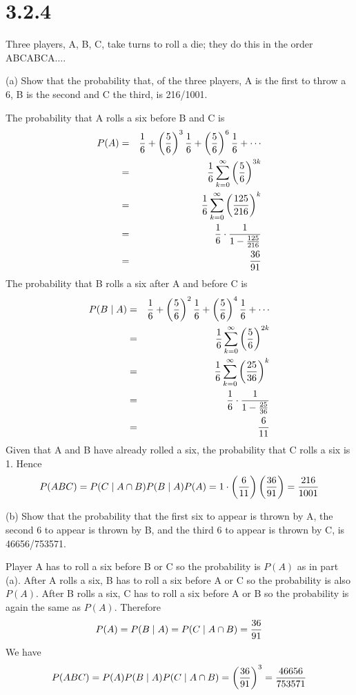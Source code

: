 \section*{3.2.4}
Three players, A, B, C, take turns to roll a die;
they do this in the order ABCABCA$\ldots$.

\bigskip
\noindent
(a) Show that the probability that, of the three players, A
is the first to throw a 6, B is the second and C the third,
is 216/1001.

\bigskip
\noindent
The probability that A rolls a six before B and C is
\begin{eqnarray*}
P(A)&=&{1\over6}+\left({5\over6}\right)^3{1\over6}
+\left({5\over6}\right)^6{1\over6}+\cdots
\\
&=&{1\over6}\sum_{k=0}^\infty\left({5\over6}\right)^{3k}
\\
&=&{1\over6}\sum_{k=0}^\infty\left({125\over216}\right)^k
\\
&=&{1\over6}\cdot{1\over1-{125\over216}}
\\
&=&{36\over91}
\end{eqnarray*}
The probability that B rolls a six after A and before C is
\begin{eqnarray*}
P(B\mid A)&=&{1\over6}+\left({5\over6}\right)^2{1\over6}
+\left({5\over6}\right)^4{1\over6}+\cdots
\\
&=&{1\over6}\sum_{k=0}^\infty\left({5\over6}\right)^{2k}
\\
&=&{1\over6}\sum_{k=0}^\infty\left({25\over36}\right)^k
\\
&=&{1\over6}\cdot{1\over1-{25\over36}}
\\
&=&{6\over11}
\end{eqnarray*}
Given that A and B have already rolled a six, the probability that C
rolls a six is 1.
Hence
$$P(ABC)=P(C\mid A\cap B)P(B\mid A)P(A)
=1\cdot\left({6\over11}\right)\left({36\over91}\right)
={216\over1001}$$

\bigskip
\noindent
(b) Show that the probability that the first six to appear is
thrown by A, the second 6 to appear is thrown by B, and the third
6 to appear is thrown by C, is 46656/753571.

\bigskip
\noindent
Player A has to roll a six before B or C so the probability is
$P(A)$ as in part (a).
After A rolls a six, B has to roll a six before A or C so the
probability is also $P(A)$.
After B rolls a six, C has to roll a six before A or B so the
probability is again the same as $P(A)$. Therefore 
$$P(A)=P(B\mid A)=P(C\mid A\cap B)={36\over91}$$
We have
$$P(ABC)=P(A)P(B\mid A)P(C\mid A\cap B)=\left({36\over91}\right)^3
={46656\over753571}$$
